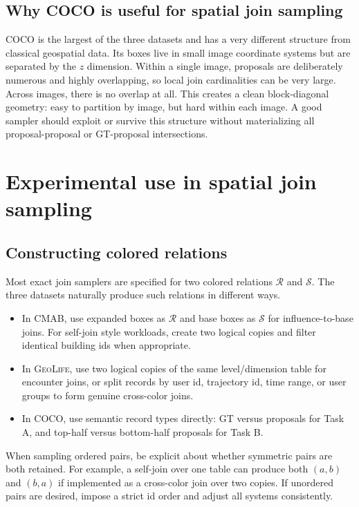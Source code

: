 \documentclass[11pt]{article}
\newcommand{\Rrel}{\mathcal R}
\newcommand{\Srel}{\mathcal S}
\newcommand{\cmab}{\textsc{CMAB}}
\newcommand{\geolife}{\textsc{GeoLife}}
\newcommand{\coco}{\textsc{COCO}}
\begin{document}
\subsection{Why \coco{} is useful for spatial join sampling}

\coco{} is the largest of the three datasets and has a very different structure from classical geospatial data.  Its boxes live in small image coordinate systems but are separated by the $z$ dimension.  Within a single image, proposals are deliberately numerous and highly overlapping, so local join cardinalities can be very large.  Across images, there is no overlap at all.  This creates a clean block-diagonal geometry: easy to partition by image, but hard within each image.  A good sampler should exploit or survive this structure without materializing all proposal-proposal or GT-proposal intersections.

\section{Experimental use in spatial join sampling}
\label{sec:experimental-use}

\subsection{Constructing colored relations}

Most exact join samplers are specified for two colored relations $\Rrel$ and $\Srel$.  The three datasets naturally produce such relations in different ways.

\begin{itemize}[leftmargin=2em,itemsep=2pt]
  \item In \cmab{}, use expanded boxes as $\Rrel$ and base boxes as $\Srel$ for influence-to-base joins.  For self-join style workloads, create two logical copies and filter identical building ids when appropriate.
  \item In \geolife{}, use two logical copies of the same level/dimension table for encounter joins, or split records by user id, trajectory id, time range, or user groups to form genuine cross-color joins.
  \item In \coco{}, use semantic record types directly: GT versus proposals for Task A, and top-half versus bottom-half proposals for Task B.
\end{itemize}

When sampling ordered pairs, be explicit about whether symmetric pairs are both retained.  For example, a self-join over one table can produce both $(a,b)$ and $(b,a)$ if implemented as a cross-color join over two copies.  If unordered pairs are desired, impose a strict id order and adjust all systems consistently.
\end{document}
